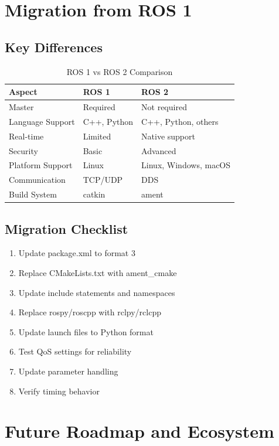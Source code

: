 \documentclass[a4paper,12pt]{book}
\begin{document}
\chapter{Migration from ROS 1}

\section{Key Differences}

\begin{table}[H]
\centering
\begin{tabular}{|l|l|l|}
\hline
\textbf{Aspect} & \textbf{ROS 1} & \textbf{ROS 2} \\
\hline
Master & Required & Not required \\
\hline
Language Support & C++, Python & C++, Python, others \\
\hline
Real-time & Limited & Native support \\
\hline
Security & Basic & Advanced \\
\hline
Platform Support & Linux & Linux, Windows, macOS \\
\hline
Communication & TCP/UDP & DDS \\
\hline
Build System & catkin & ament \\
\hline
\end{tabular}
\caption{ROS 1 vs ROS 2 Comparison}
\label{tab:ros1_vs_ros2}
\end{table}

\section{Migration Checklist}

\begin{enumerate}
\item Update package.xml to format 3
\item Replace CMakeLists.txt with ament\_cmake
\item Update include statements and namespaces
\item Replace rospy/roscpp with rclpy/rclcpp
\item Update launch files to Python format
\item Test QoS settings for reliability
\item Update parameter handling
\item Verify timing behavior
\end{enumerate}

\chapter{Future Roadmap and Ecosystem}
\end{document}
